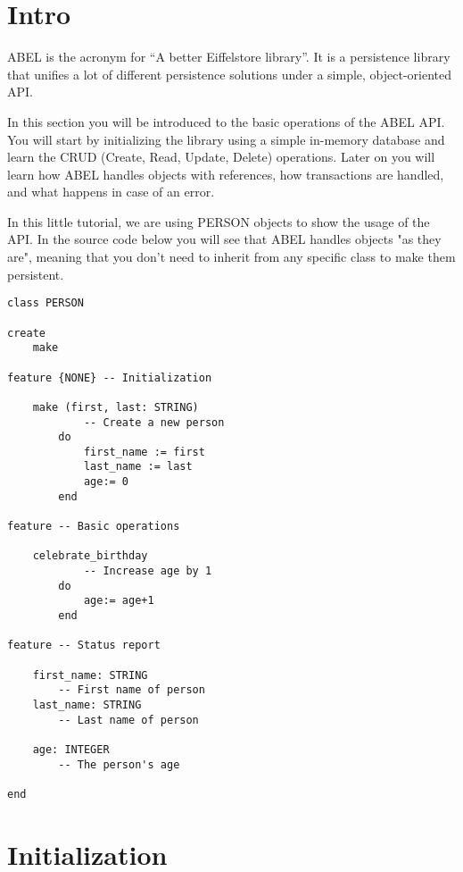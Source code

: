 
\section{Intro}

ABEL is the acronym for ``A better Eiffelstore library''.
It is a persistence library that unifies a lot of different persistence solutions under a simple, object-oriented API.

In this section you will be introduced to the basic operations of the ABEL API. 
You will start by initializing the library using a simple in-memory database and learn the CRUD (Create, Read, Update, Delete) operations.
Later on you will learn how ABEL handles objects with references, how transactions are handled, and what happens in case of an error.

In this little tutorial, we are using PERSON objects to show the usage of the API.
In the source code below you will see that ABEL handles objects "as they are", meaning that you don't need to inherit from any specific class to make them persistent.

\begin{lstlisting}[language=OOSC2Eiffel, captionpos=b, caption={The PERSON class}, label={lst:simple_insert}]
class PERSON

create
	make

feature {NONE} -- Initialization

	make (first, last: STRING)
			-- Create a new person
		do
			first_name := first
			last_name := last
			age:= 0
		end

feature -- Basic operations

	celebrate_birthday
			-- Increase age by 1
		do
			age:= age+1
		end

feature -- Status report

	first_name: STRING
		-- First name of person
	last_name: STRING
		-- Last name of person

	age: INTEGER
		-- The person's age

end

\end{lstlisting}





\section{Initialization}

